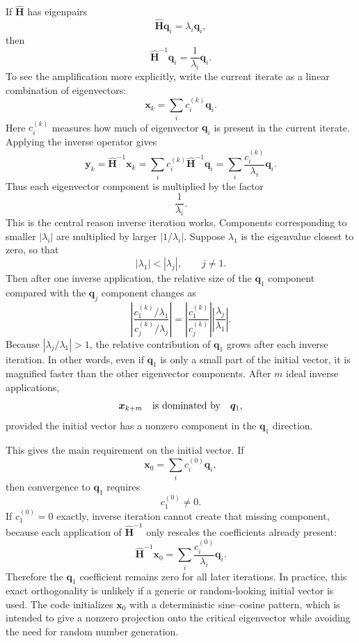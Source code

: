 \documentclass[11pt]{article}
\begin{document}
If \(\widehat{\bm H}\) has eigenpairs
\[
    \widehat{\bm H}\bm q_i = \lambda_i \bm q_i,
\]
then
\[
    \widehat{\bm H}^{-1}\bm q_i =
    \frac{1}{\lambda_i}\bm q_i.
\]
To see the amplification more explicitly, write the current iterate as a
linear combination of eigenvectors:
\[
    \bm x_k = \sum_i c_i^{(k)} \bm q_i .
\]
Here \(c_i^{(k)}\) measures how much of eigenvector \(\bm q_i\) is
present in the current iterate. Applying the inverse operator gives
\[
    \bm y_k
    =
    \widehat{\bm H}^{-1}\bm x_k
    =
    \sum_i c_i^{(k)}
    \widehat{\bm H}^{-1}\bm q_i
    =
    \sum_i
    \frac{c_i^{(k)}}{\lambda_i}
    \bm q_i .
\]
Thus each eigenvector component is multiplied by the factor
\[
    \frac{1}{\lambda_i}.
\]
This is the central reason inverse iteration works. Components
corresponding to smaller \(|\lambda_i|\) are multiplied by larger
\(|1/\lambda_i|\). Suppose \(\lambda_1\) is the eigenvalue closest to
zero, so that
\[
    |\lambda_1| < |\lambda_j|, \qquad j \ne 1.
\]
Then after one inverse application, the relative size of the
\(\bm q_1\) component compared with the \(\bm q_j\) component changes as
\[
    \left|
    \frac{c_1^{(k)}/\lambda_1}
         {c_j^{(k)}/\lambda_j}
    \right|
    =
    \left|
    \frac{c_1^{(k)}}{c_j^{(k)}}
    \right|
    \left|
    \frac{\lambda_j}{\lambda_1}
    \right|.
\]
Because \(|\lambda_j/\lambda_1|>1\), the relative contribution of
\(\bm q_1\) grows after each inverse iteration. In other words, even if
\(\bm q_1\) is only a small part of the initial vector, it is magnified
faster than the other eigenvector components. After \(m\) ideal inverse
applications,
\[
    \bm x_{k+m}
    \quad \hbox{is dominated by} \quad
    \bm q_1,
\]
provided the initial vector has a nonzero component in the
\(\bm q_1\) direction.

This gives the main requirement on the initial vector. If
\[
    \bm x_0 = \sum_i c_i^{(0)}\bm q_i,
\]
then convergence to \(\bm q_1\) requires
\[
    c_1^{(0)} \ne 0.
\]
If \(c_1^{(0)}=0\) exactly, inverse iteration cannot create that missing
component, because each application of \(\widehat{\bm H}^{-1}\) only
rescales the coefficients already present:
\[
    \widehat{\bm H}^{-1}\bm x_0
    =
    \sum_i
    \frac{c_i^{(0)}}{\lambda_i}\bm q_i.
\]
Therefore the \(\bm q_1\) coefficient remains zero for all later
iterations. In practice, this exact orthogonality is unlikely if a
generic or random-looking initial vector is used. The code initializes
\(\bm x_0\) with a deterministic sine--cosine pattern, which is intended
to give a nonzero projection onto the critical eigenvector while avoiding
the need for random number generation.
\end{document}
